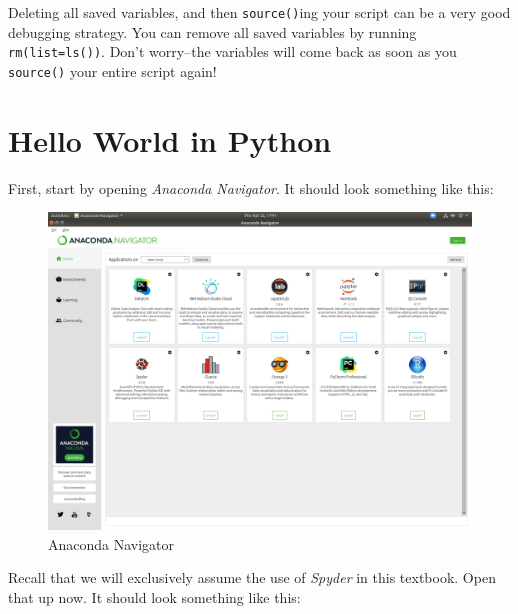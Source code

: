 \documentclass[
  12pt,
  krantz2]{krantz}
\begin{document}
\begin{rmd-details}
Deleting all saved variables, and then \texttt{source()}ing your script can be a very good debugging strategy. You can remove all saved variables by running \texttt{rm(list=ls())}. Don't worry--the variables will come back as soon as you \texttt{source()} your entire script again!

\end{rmd-details}

\hypertarget{hello-world-in-python}{%
\section{Hello World in Python}\label{hello-world-in-python}}

First, start by opening \emph{Anaconda Navigator}. It should look something like this:

\begin{figure}

{\centering \includegraphics[width=0.8\linewidth]{pics/anaconda_navigator} 

}

\caption{Anaconda Navigator}\label{fig:anaconda-navigator}
\end{figure}

Recall that we will exclusively assume the use of \emph{Spyder} in this textbook. Open that up now. It should look something like this:
\end{document}
